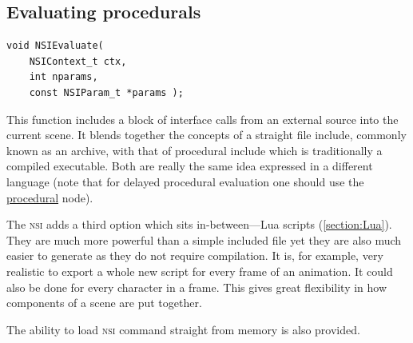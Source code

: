 \documentclass[oneside,ebook]{memoir}
\newcommand*{\acronym}[1]{\textsc{\lowercase{#1}}}
\begin{document}
\subsection{Evaluating procedurals}
\label{CAPI:nsievaluate}
\begin{lstlisting}[style=CAPI]
void NSIEvaluate(
	NSIContext_t ctx,
	int nparams,
	const NSIParam_t *params );
\end{lstlisting}
This function includes a block of interface calls from an external source into the current scene. It blends together the concepts of a straight file include, commonly known as an archive, with that of  procedural include which is traditionally a compiled executable. Both are really the same idea expressed in a different language (note that for delayed procedural evaluation one should use the \hyperref[section:proceduralnode]{procedural} node).

The \acronym{NSI} adds a third option which sits in-between---Lua scripts (\autoref{section:Lua}). They are much more powerful than a simple included file yet they are also much easier to generate as they do not require compilation. It is, for example, very realistic to export a whole new script for every frame of an animation. It could also be done for every character in a frame. This gives great flexibility in how components of a scene are put together.

The ability to load \acronym{NSI} command straight from memory is also provided.
\end{document}
